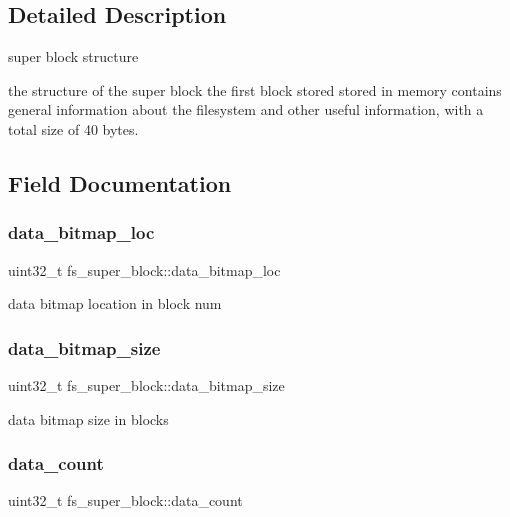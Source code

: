 \subsection{Detailed Description}
super block structure 

the structure of the super block the first block stored stored in memory contains general information about the filesystem and other useful information, with a total size of 40 bytes. 

\subsection{Field Documentation}
\mbox{\label{structfs__super__block_af8051b81bc195298cec178c726c84127}} 
\subsubsection{\texorpdfstring{data\_bitmap\_loc}{data\_bitmap\_loc}}
{\footnotesize\ttfamily uint32\+\_\+t fs\+\_\+super\+\_\+block\+::data\+\_\+bitmap\+\_\+loc}

data bitmap location in block num \mbox{\label{structfs__super__block_ab6371fd268dc5744f7fe5df0968f6b83}} 
\subsubsection{\texorpdfstring{data\_bitmap\_size}{data\_bitmap\_size}}
{\footnotesize\ttfamily uint32\+\_\+t fs\+\_\+super\+\_\+block\+::data\+\_\+bitmap\+\_\+size}

data bitmap size in blocks \mbox{\label{structfs__super__block_a8a0178409891f1219ced9c2fd1e0068b}} 
\subsubsection{\texorpdfstring{data\_count}{data\_count}}
{\footnotesize\ttfamily uint32\+\_\+t fs\+\_\+super\+\_\+block\+::data\+\_\+count}

